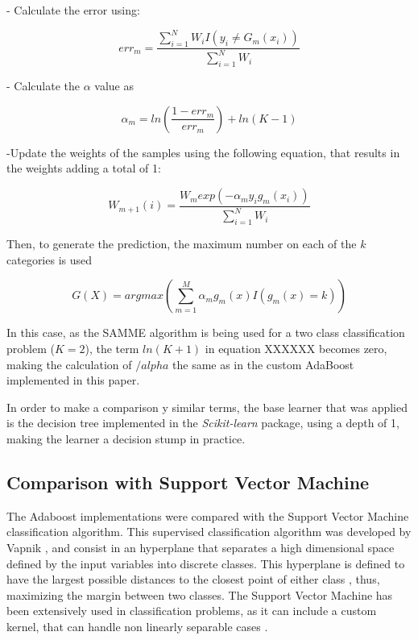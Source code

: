 \documentclass[11pt,twocolumn,letterpaper]{article}
\begin{document}
- Calculate the error using:

\begin{equation}
	err_m = \frac{\sum_{i=1}^{N} W_i I(y_i \neq G_m(x_i))}{\sum_{i=1}^{N} W_i} 
\end{equation}

- Calculate the $\alpha$ value as

\begin{equation}
	\alpha_m = ln(\frac{1-err_m}{err_m}) + ln(K-1)
\end{equation}

-Update the weights of the samples using the following equation, that results in the weights adding  a total of 1:

\begin{equation}
	W_{m+1} (i) = \frac{W_m exp(-\alpha_m y_i g_m(x_i))}{\sum_{i=1}^{N} W_i}
\end{equation}

Then, to generate the prediction, the maximum number on each of the $k$ categories is used

\begin{equation}
	G(X) = argmax(\sum_{m=1}^{M} \alpha_m g_m(x) I(g_m(x) = k))
\end{equation}

In this case, as the SAMME algorithm is being used for a two class classification problem ($K = 2$), the term $ln(K+1)$ in equation XXXXXX becomes zero, making the calculation of $/alpha$ the same as in the custom AdaBoost implemented in this paper.

In order to make a comparison y similar terms, the base learner that was applied is the decision tree implemented in the \textit{Scikit-learn} package, using a depth of 1, making the learner a decision stump in practice. 

\subsection{Comparison with Support Vector Machine}

The Adaboost implementations were compared with the Support Vector Machine classification algorithm. This supervised classification algorithm was developed by Vapnik \cite{Vapnik1995}, and consist in an hyperplane that separates a high dimensional space defined by the input variables into discrete classes. This hyperplane is defined to have the largest possible distances to the closest point of either class , thus, maximizing the margin between two classes. The Support Vector Machine has been extensively used in classification problems, as it can include a custom kernel, that can handle non linearly separable cases \cite{Hastie2009}.
\end{document}
